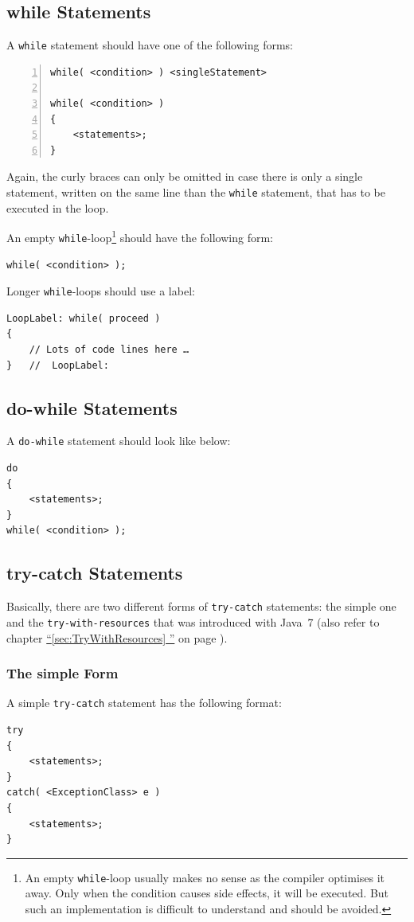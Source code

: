 \documentclass[12pt,a4paper,titlepage, parskip=half, headsepline, footsepline, cleardoubleplain]{scrbook}
\newcommand*{\tqfullvref}[1]{\hyperref[{#1}]{“\ref*{#1} \nameref*{#1}”} on page \pageref{#1}}
\begin{document}
\subsection{while Statements}\label{sec:WhileStatements}
A \lstinline|while| statement should have one of the following forms:
\begin{lstlisting}[numbers=left]
while( <condition> ) <singleStatement>

while( <condition> )
{
    <statements>;
}
\end{lstlisting}

Again, the curly braces can only be omitted in case there is only a single statement, written on the same line than the \lstinline|while| statement, that has to be executed in the loop.

An empty \lstinline|while|-loop\footnote{An empty \lstinline|while|-loop usually makes no sense as the compiler optimises it away. Only when the condition causes side effects, it will be executed. But such an implementation is difficult to understand and should be avoided.} should have the following form: 
\begin{lstlisting}
while( <condition> );
\end{lstlisting}

Longer \lstinline|while|-loops should use a label:
\begin{lstlisting}
LoopLabel: while( proceed )
{
    // Lots of code lines here …
}   //  LoopLabel:
\end{lstlisting}

\subsection{do-while Statements}
A \lstinline|do-while| statement should look like below:
\begin{lstlisting}
do
{
    <statements>;
}
while( <condition> );
\end{lstlisting}

\subsection{try-catch Statements}
Basically, there are two different forms of \lstinline|try-catch| statements: the simple one and the \lstinline|try-with-resources| that was introduced with Java~7 (also refer to chapter \tqfullvref{sec:TryWithResources}).

\subsubsection{The simple Form}
A simple \lstinline|try-catch| statement has the following format:
\begin{lstlisting}
try
{
    <statements>;
}
catch( <ExceptionClass> e )
{
    <statements>;
}
\end{lstlisting}
\end{document}
